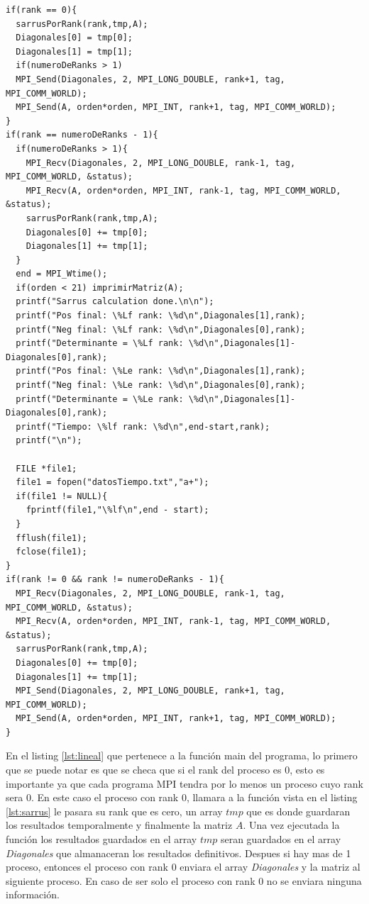 \documentclass[10pt]{IEEEtran}
\begin{document}
\begin{lstlisting}[caption={Implementacion de Comunicación Lineal},label={lst:lineal}]
if(rank == 0){
  sarrusPorRank(rank,tmp,A);
  Diagonales[0] = tmp[0];
  Diagonales[1] = tmp[1];
  if(numeroDeRanks > 1)
  MPI_Send(Diagonales, 2, MPI_LONG_DOUBLE, rank+1, tag, MPI_COMM_WORLD);
  MPI_Send(A, orden*orden, MPI_INT, rank+1, tag, MPI_COMM_WORLD);
}
if(rank == numeroDeRanks - 1){
  if(numeroDeRanks > 1){
    MPI_Recv(Diagonales, 2, MPI_LONG_DOUBLE, rank-1, tag, MPI_COMM_WORLD, &status);
    MPI_Recv(A, orden*orden, MPI_INT, rank-1, tag, MPI_COMM_WORLD, &status);
    sarrusPorRank(rank,tmp,A);
    Diagonales[0] += tmp[0];
    Diagonales[1] += tmp[1];
  }
  end = MPI_Wtime();
  if(orden < 21) imprimirMatriz(A);
  printf("Sarrus calculation done.\n\n");
  printf("Pos final: \%Lf rank: \%d\n",Diagonales[1],rank);
  printf("Neg final: \%Lf rank: \%d\n",Diagonales[0],rank);
  printf("Determinante = \%Lf rank: \%d\n",Diagonales[1]-Diagonales[0],rank);
  printf("Pos final: \%Le rank: \%d\n",Diagonales[1],rank);
  printf("Neg final: \%Le rank: \%d\n",Diagonales[0],rank);
  printf("Determinante = \%Le rank: \%d\n",Diagonales[1]-Diagonales[0],rank);
  printf("Tiempo: \%lf rank: \%d\n",end-start,rank);
  printf("\n");

  FILE *file1;
  file1 = fopen("datosTiempo.txt","a+");
  if(file1 != NULL){
    fprintf(file1,"\%lf\n",end - start);
  }
  fflush(file1);
  fclose(file1);
}
if(rank != 0 && rank != numeroDeRanks - 1){
  MPI_Recv(Diagonales, 2, MPI_LONG_DOUBLE, rank-1, tag, MPI_COMM_WORLD, &status);
  MPI_Recv(A, orden*orden, MPI_INT, rank-1, tag, MPI_COMM_WORLD, &status);
  sarrusPorRank(rank,tmp,A);
  Diagonales[0] += tmp[0];
  Diagonales[1] += tmp[1];
  MPI_Send(Diagonales, 2, MPI_LONG_DOUBLE, rank+1, tag, MPI_COMM_WORLD);
  MPI_Send(A, orden*orden, MPI_INT, rank+1, tag, MPI_COMM_WORLD);
}
\end{lstlisting}

En el listing \ref{lst:lineal} que pertenece a la función main del programa, lo primero que se puede notar es que se checa que si el rank del proceso es 0, esto es importante ya que cada programa MPI tendra por lo menos un proceso cuyo rank sera 0. En este caso el proceso con rank 0, llamara a la función vista en el listing \ref{lst:sarrus} le pasara su rank que es cero, un array $tmp$ que es donde guardaran los resultados temporalmente y finalmente la matriz $A$. Una vez ejecutada la función los resultados guardados en el array $tmp$ seran guardados en el array \textit{Diagonales} que almanaceran los resultados definitivos. Despues si hay mas de 1 proceso, entonces el proceso con rank 0 enviara el array \textit{Diagonales} y la matriz al siguiente proceso. En caso de ser solo el proceso con rank 0 no se enviara ninguna información.
\end{document}

